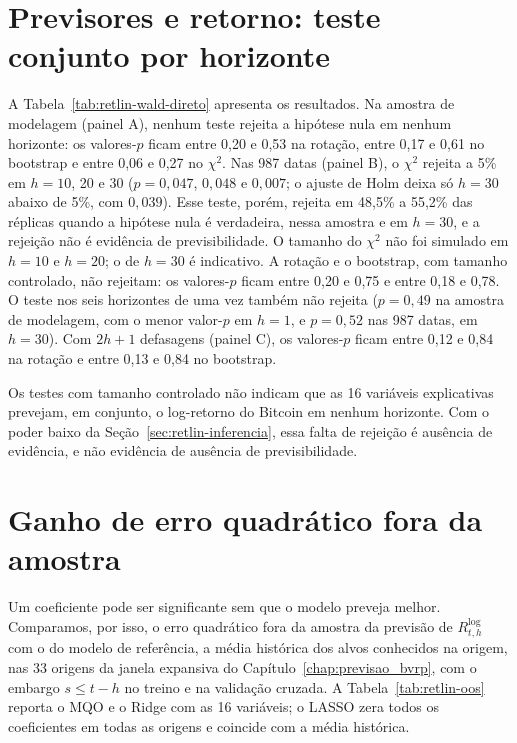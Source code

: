 \section{Previsores e retorno: teste conjunto por horizonte}
\label{sec:retlin-resultados}

A Tabela~\ref{tab:retlin-wald-direto} apresenta os resultados. Na amostra de
modelagem (painel A), nenhum teste rejeita a hipótese nula em nenhum
horizonte: os valores-$p$ ficam entre 0,20 e 0,53 na rotação, entre 0,17 e
0,61 no bootstrap e entre 0,06 e 0,27 no $\chi^2$. Nas 987 datas (painel B),
o $\chi^2$ rejeita a 5\% em $h = 10$, 20 e 30 ($p = 0{,}047$, $0{,}048$ e
$0{,}007$; o ajuste de Holm deixa só $h = 30$ abaixo de 5\%, com $0{,}039$).
Esse teste, porém, rejeita em 48,5\% a 55,2\% das réplicas quando a hipótese
nula é verdadeira, nessa amostra e em $h = 30$, e a rejeição não é evidência
de previsibilidade. O tamanho do $\chi^2$ não foi simulado em $h = 10$ e
$h = 20$; o de $h = 30$ é indicativo. A rotação e o bootstrap, com tamanho
controlado, não rejeitam: os valores-$p$ ficam entre 0,20 e 0,75 e entre 0,18
e 0,78. O teste nos seis horizontes de uma vez também não rejeita
($p = 0{,}49$ na amostra de modelagem, com o menor valor-$p$ em $h = 1$, e
$p = 0{,}52$ nas 987 datas, em $h = 30$). Com $2h+1$ defasagens (painel C), os
valores-$p$ ficam entre 0,12 e 0,84 na rotação e entre 0,13 e 0,84 no
bootstrap.



Os testes com tamanho controlado não indicam que as 16 variáveis explicativas
prevejam, em conjunto, o log-retorno do Bitcoin em nenhum horizonte. Com o
poder baixo da Seção~\ref{sec:retlin-inferencia}, essa falta de rejeição é
ausência de evidência, e não evidência de ausência de previsibilidade.

\section{Ganho de erro quadrático fora da amostra}
\label{sec:retlin-oos}

Um coeficiente pode ser significante sem que o modelo preveja melhor.
Comparamos, por isso, o erro quadrático fora da amostra da previsão
de $R^{\log}_{t,h}$ com o do modelo de referência, a média histórica dos
alvos conhecidos na origem, nas 33 origens da janela expansiva do
Capítulo~\ref{chap:previsao_bvrp}, com o embargo $s \le t-h$ no treino e na
validação cruzada. A Tabela~\ref{tab:retlin-oos} reporta o MQO e o Ridge com
as 16 variáveis; o LASSO zera todos os coeficientes em todas as origens e
coincide com a média histórica.

